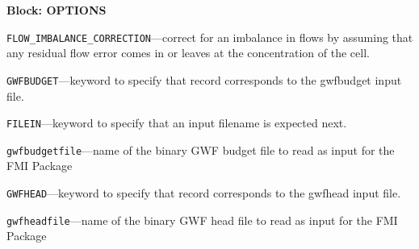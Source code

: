 
\item \textbf{Block: OPTIONS}

\begin{description}
\item \texttt{FLOW\_IMBALANCE\_CORRECTION}---correct for an imbalance in flows by assuming that any residual flow error comes in or leaves at the concentration of the cell.

\item \texttt{GWFBUDGET}---keyword to specify that record corresponds to the gwfbudget input file.

\item \texttt{FILEIN}---keyword to specify that an input filename is expected next.

\item \texttt{gwfbudgetfile}---name of the binary GWF budget file to read as input for the FMI Package

\item \texttt{GWFHEAD}---keyword to specify that record corresponds to the gwfhead input file.

\item \texttt{gwfheadfile}---name of the binary GWF head file to read as input for the FMI Package

\end{description}

